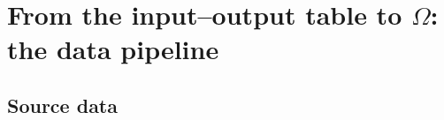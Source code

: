 \section{From the input--output table to $\Omega$: the data pipeline}\label{app:pipeline}


\subsection{Source data}\label{app:pipeline-source}

